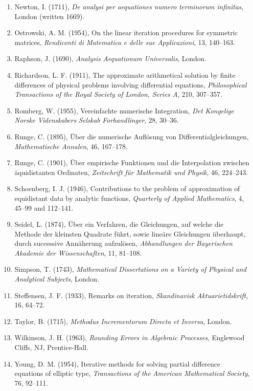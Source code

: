 \documentclass[11pt,a4paper]{article}
\numberwithin{equation}{section}
\theoremstyle{definition}
\begin{document}
\begin{enumerate}
{Aids to Computation}, 10, 208--215.
\item Newton, I. (1711), \emph{De analysi per aequationes numero terminorum infinitas}, London (written 1669).
\item Ostrowski, A. M. (1954), On the linear iteration procedures for symmetric matrices, \emph{Rendiconti di Matematica e delle
sue Applicazioni}, 13, 140--163.
\item Raphson, J. (1690), \emph{Analysis Aequationum Universalis}, London.
\item Richardson, L. F. (1911), The approximate arithmetical solution by finite differences of physical problems involving differential
equations, \emph{Philosophical Transactions of the Royal Society of London, Series A}, 210, 307--357.
\item Romberg, W. (1955), Vereinfachte numerische Integration, \emph{Det Kongelige Norske Videnskabers Selskab Forhandlinger}, 28,
30--36.
\item Runge, C. (1895), \"Uber die numerische Aufl\"osung von Differentialgleichungen, \emph{Mathematische Annalen}, 46, 167--178.
\item Runge, C. (1901), \"Uber empirische Funktionen und die Interpolation zwischen \"aquidistanten Ordinaten, \emph{Zeitschrift f\"ur
Mathematik und Physik}, 46, 224--243.
\item Schoenberg, I. J. (1946), Contributions to the problem of approximation of equidistant data by analytic functions, \emph{Quarterly
of Applied Mathematics}, 4, 45--99 and 112--141.
\item Seidel, L. (1874), \"Uber ein Verfahren, die Gleichungen, auf welche die Methode der kleinsten Quadrate f\"uhrt, sowie
line\"are Gleichungen \"uberhaupt, durch successive Ann\"aherung aufzul\"osen, \emph{Abhandlungen der Bayerischen Akademie der
Wissenschaften}, 11, 81--108.
\item Simpson, T. (1743), \emph{Mathematical Dissertations on a Variety of Physical and Analytical Subjects}, London.
\item Steffensen, J. F. (1933), Remarks on iteration, \emph{Skandinavisk Aktuarietidskrift}, 16, 64--72.
\item Taylor, B. (1715), \emph{Methodus Incrementorum Directa et Inversa}, London.
\item Wilkinson, J. H. (1963), \emph{Rounding Errors in Algebraic Processes}, Englewood Cliffs, NJ, Prentice-Hall.
\item Young, D. M. (1954), Iterative methods for solving partial difference equations of elliptic type, \emph{Transactions of the
American Mathematical Society}, 76, 92--111.
\end{enumerate}
\end{document}
